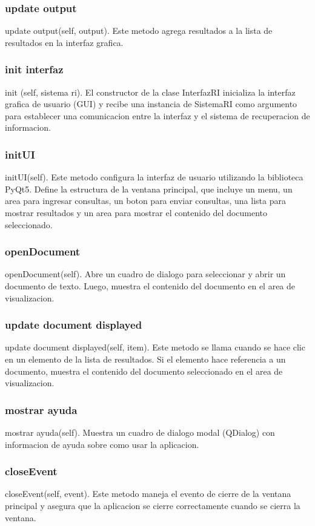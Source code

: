\subsubsection{update output}
update output(self, output). Este metodo agrega resultados a la lista de resultados en la interfaz
grafica.
\subsubsection{init interfaz}
init (self, sistema ri). El constructor de la clase InterfazRI inicializa la interfaz grafica de usuario
(GUI) y recibe una instancia de SistemaRI como argumento para establecer una comunicacion entre
la interfaz y el sistema de recuperacion de informacion.
\subsubsection{initUI}
initUI(self). Este metodo configura la interfaz de usuario utilizando la biblioteca PyQt5. Define la
estructura de la ventana principal, que incluye un menu, un area para ingresar consultas, un boton
para enviar consultas, una lista para mostrar resultados y un area para mostrar el contenido del
documento seleccionado.
\subsubsection{openDocument}
openDocument(self). Abre un cuadro de dialogo para seleccionar y abrir un documento de texto.
Luego, muestra el contenido del documento en el area de visualizacion.
\subsubsection{update document displayed}
update document displayed(self, item). Este metodo se llama cuando se hace clic en un elemento de la lista de resultados. Si el elemento hace referencia a un documento, muestra el contenido
del documento seleccionado en el area de visualizacion.
\subsubsection{mostrar ayuda}
mostrar ayuda(self). Muestra un cuadro de dialogo modal (QDialog) con informacion de ayuda
sobre como usar la aplicacion.
\subsubsection{closeEvent}
closeEvent(self, event). Este metodo maneja el evento de cierre de la ventana principal y asegura
que la aplicacion se cierre correctamente cuando se cierra la ventana.

